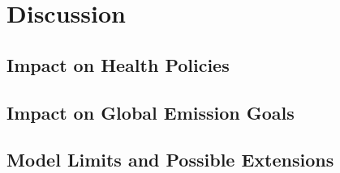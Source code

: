 %
%
% 
% 
% 

\chapter{Discussion}
\label{chap:Style}

\section{Impact on Health Policies}
\section{Impact on Global Emission Goals}
\section{Model Limits and Possible Extensions}







